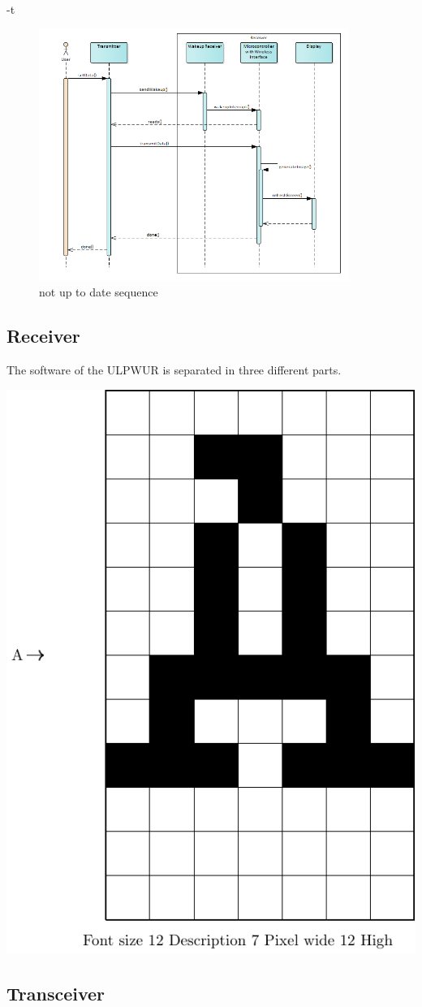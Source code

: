 -t\begin{figure}[ht]
	\centering
	\includegraphics[width=0.9\textwidth]{4-development/software/graphics/1.png}
	\caption{not up to date sequence\label{software:sequence}}
\end{figure}

\subsection{Receiver}

The software of the ULPWUR is separated in three different parts. 

\includegraphics[scale=0.3]{4-development/software/graphics/font12.pdf}


\subsection{Transceiver}